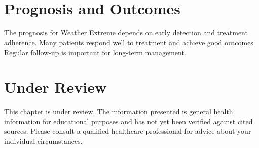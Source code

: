 \section*{Prognosis and Outcomes}
The prognosis for Weather Extreme depends on early detection and treatment adherence. Many patients respond well to treatment and achieve good outcomes. Regular follow-up is important for long-term management.
\section*{Under Review}
This chapter is under review. The information presented is general health information for educational purposes and has not yet been verified against cited sources. Please consult a qualified healthcare professional for advice about your individual circumstances.


\clearpage
